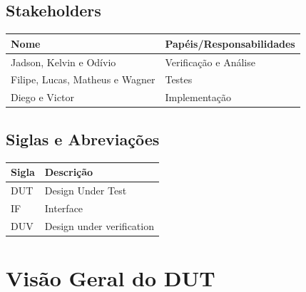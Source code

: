 \documentclass{article}
\begin{document}
	\subsection{Stakeholders}
  \FloatBarrier
  \begin{table}[H] 
    \begin{center}
      \begin{tabular}[pos]{|m{5cm} | m{8cm}|} 
        \hline %
        \cellcolor[gray]{0.9}\textbf{Nome} & \cellcolor[gray]{0.9}
		\textbf{Papéis/Responsabilidades} \\ 
        \hline Jadson, Kelvin e Odívio & Verificação e Análise \\ \hline
         Filipe, Lucas, Matheus e Wagner & Testes \\ \hline
         Diego e Victor & Implementação \\ \hline
      \end{tabular}
    \end{center}
  \end{table} 
  
  \subsection{Siglas e Abreviações}
  \FloatBarrier
  \begin{table}[H]
    \begin{center}
      \begin{tabular}[pos]{|m{2cm} | m{11cm}|} 
				\hline 
				\cellcolor[gray]{0.9}\textbf{Sigla} & \cellcolor[gray]{0.9}\textbf{Descrição} \\ \hline
				DUT & Design Under Test \\ \hline
        		IF  & Interface \\ \hline
        		DUV & Design under verification \\ \hline
      \end{tabular}
    \end{center}
  \end{table}  

	\newpage
	\section{Visão Geral do DUT}
	
\end{document}
